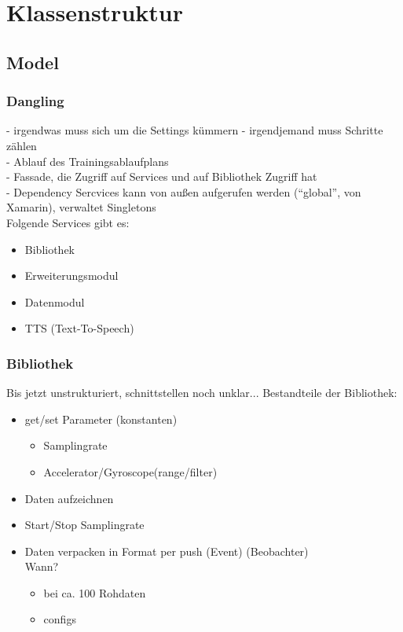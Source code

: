 \documentclass[a4paper,12pt]{article}
\author {ab Protokoll 12.3.19}
\begin{document}
\section{Klassenstruktur}

\subsection{Model}
\subsubsection{Dangling}
- irgendwas muss sich um die Settings kümmern
- irgendjemand muss Schritte zählen\\
- Ablauf des Trainingsablaufplans\\
- Fassade, die Zugriff auf Services und auf Bibliothek Zugriff hat\\
- Dependency Sercvices kann von außen aufgerufen werden (``global'', von Xamarin), verwaltet Singletons\\
Folgende Services gibt es:
\begin{itemize}
    \item Bibliothek
    \item Erweiterungsmodul
    \item Datenmodul
    \item TTS (Text-To-Speech)
\end{itemize}
\subsubsection{Bibliothek} 
Bis jetzt unstrukturiert, schnittstellen noch unklar...
Bestandteile der Bibliothek:
\begin{itemize}
    \item {
        get/set Parameter (konstanten)
        \begin{itemize}
            \item Samplingrate
            \item Accelerator/Gyroscope(range/filter)
        \end{itemize}
        }
    \item Daten aufzeichnen %
    \item Start/Stop Samplingrate
    \item {
        Daten verpacken in Format per push (Event) (Beobachter)\\
        Wann? %
        \begin{itemize}
            \item bei ca. 100 Rohdaten
            \item configs %
        \end{itemize}
        } 
\end{itemize}
\end{document}
